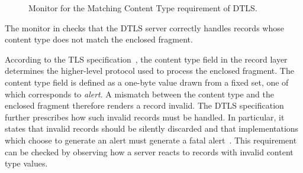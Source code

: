 \begin{figure}[h]
	\centering
	\caption{Monitor for the Matching Content Type requirement of DTLS.}
	\label{fig:monitor:dtls:content-type}
\end{figure}

The monitor in  checks that the DTLS server correctly handles records whose content type does not match the enclosed fragment.

According to the TLS specification~\cite[p.~19]{RFC5246}, the content type field in the record layer determines the higher-level protocol used to process the enclosed fragment.
The content type field is defined as a one-byte value drawn from a fixed set, one of which corresponds to \emph{alert}.
A mismatch between the content type and the enclosed fragment therefore renders a record invalid.
The DTLS specification further prescribes how such invalid records must be handled.
In particular, it states that invalid records should be silently discarded and that implementations which choose to generate an alert must generate a fatal alert~\cite[p.~14]{RFC6347}.
This requirement can be checked by observing how a server reacts to records with invalid content type values.


